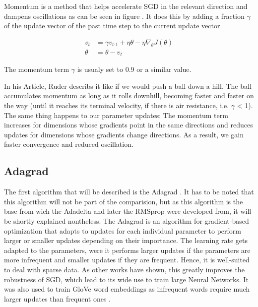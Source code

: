 \documentclass[12pt,oneside,a4paper,parskip]{scrbook}
\begin{document}
Momentum \cite{QIAN1999145, overvieDiffRSLVQ} is a method that helps accelerate SGD in the relevant direction and dampens
oscillations as can be seen in figure . It does this by adding a fraction $\gamma $ of the update vector of the past time step to the
current update vector

\begin{equation}
\begin{split}
\textit{v}_\textit{t} &= \gamma\textit{v}_\textit{t-1} + \eta \theta - \eta\nabla_\theta \textit{J}(\theta) \\
\theta &= \theta - \textit{v}_\textit{t}
\end{split}
\end{equation}

The momentum term $\gamma $ is usualy set to 0.9 or a similar value.

In his Article, Ruder \cite{overvieDiffRSLVQ} describs it like if we would push a ball down a hill. 
The ball accumulates momentum as long as it rolls downhill, becoming faster and faster on the way 
(until it reaches its terminal velocity, if there is air resistance, i.e. $\gamma $ < 1). 
The same thing happens to our parameter updates: The momentum term increases for dimensions whose gradients
point in the same directions and reduces updates for dimensions whose gradients change directions.
As a result, we gain faster convergence and reduced oscillation.

\subsection{Adagrad}
The first algorithm that will be described is the Adagrad \cite{Zeiler2012ADADELTAAA}. It has to be noted that this 
algorithm will not be part of the comparision, but as this algorithm is the base from wich the Adadelta and later the 
RMSprop were developed from, it will be shortly explained nontheless.
The Adagrad is an algorithm for gradient-based optimization that adapts to updates for each individual parameter to 
perform larger or smaller updates depending on their importance. The learning rate gets adapted to the parameters, were
it performs larger updates if the parameters are more infrequent and smaller updates if they are frequent.
Hence, it is well-suited to deal with sparse data. As other works \cite{dean2012large} have shown, this greatly improves
the robustness of SGD, which lead to its wide use to train large Neural Networks.
It was also used to train GloVe word embeddings as infrequent words require
much larger updates than frequent ones \cite{pennington2014glove, overvieDiffRSLVQ}.   
\end{document}
